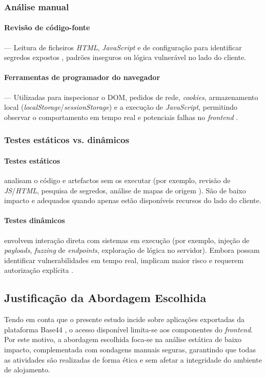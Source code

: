 \subsubsection{Análise manual}
\paragraph{Revisão de código-fonte} — Leitura de ficheiros \textit{HTML}, \textit{JavaScript} e de configuração
para identificar segredos expostos \cite{ref12}, padrões inseguros ou lógica vulnerável no lado do cliente.
\paragraph{Ferramentas de programador do navegador} — Utilizadas para inspecionar o DOM,
pedidos de rede, \textit{cookies}, armazenamento local (\textit{localStorage}/\textit{sessionStorage})
e a execução de \textit{JavaScript}, permitindo observar o comportamento em tempo real
e potenciais falhas no \textit{frontend} \cite{ref1}.

\subsubsection{Testes estáticos vs. dinâmicos}
\paragraph{Testes estáticos} analisam o código e artefactos sem os executar
(por exemplo, revisão de \textit{JS}/\textit{HTML}, pesquisa de segredos, análise de mapas de origem \cite{ref20}).
São de baixo impacto e adequados quando apenas estão disponíveis recursos do lado do cliente.
\paragraph{Testes dinâmicos} envolvem interação direta com sistemas em execução
(por exemplo, injeção de \textit{payloads}, \textit{fuzzing} de \textit{endpoints}, exploração de lógica no servidor).
Embora possam identificar vulnerabilidades em tempo real,
implicam maior risco e requerem autorização explícita \cite{ref4}.

\subsection{Justificação da Abordagem Escolhida}
Tendo em conta que o presente estudo incide sobre aplicações exportadas da plataforma Base44 \cite{ref16},
o acesso disponível limita-se aos componentes do \textit{frontend}.
Por este motivo, a abordagem escolhida foca-se na análise estática de baixo impacto,
complementada com sondagens manuais seguras,
garantindo que todas as atividades são realizadas de forma ética e sem afetar
a integridade do ambiente de alojamento.

